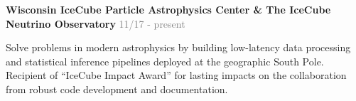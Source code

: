 
\vspace{-0.1cm}

\begin{cventries}
\vspace{-0.01cm}
  \cventry
    {} %
    {\textbf{Wisconsin IceCube Particle Astrophysics Center \& The IceCube Neutrino Observatory}} %
    {\textcolor{gray}{11/17 - present}} %
    {} %
    {
      \begin{cvitems} %
      \vspace{-0.4cm}
        \item {Solve problems in modern astrophysics by building low-latency data processing and statistical inference pipelines deployed at the geographic South Pole. Recipient of ``IceCube Impact Award'' for lasting impacts on the collaboration from robust code development and documentation.}
      \end{cvitems}
    }
\end{cventries}

\vspace{-0.15cm}

